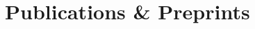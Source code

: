 \section{Publications \& Preprints}
\begin{minipage}{\width}
  \vspace{1ex}
  \printbibliography[heading=none]
\end{minipage}

